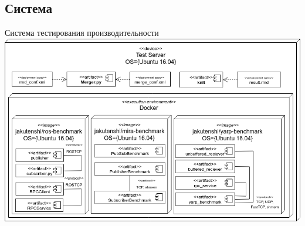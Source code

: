 \subsection{Система}
\begin{frame}{Система тестирования производительности}
	\includegraphics[scale=.37]{img/deploy.png}
\end{frame}
